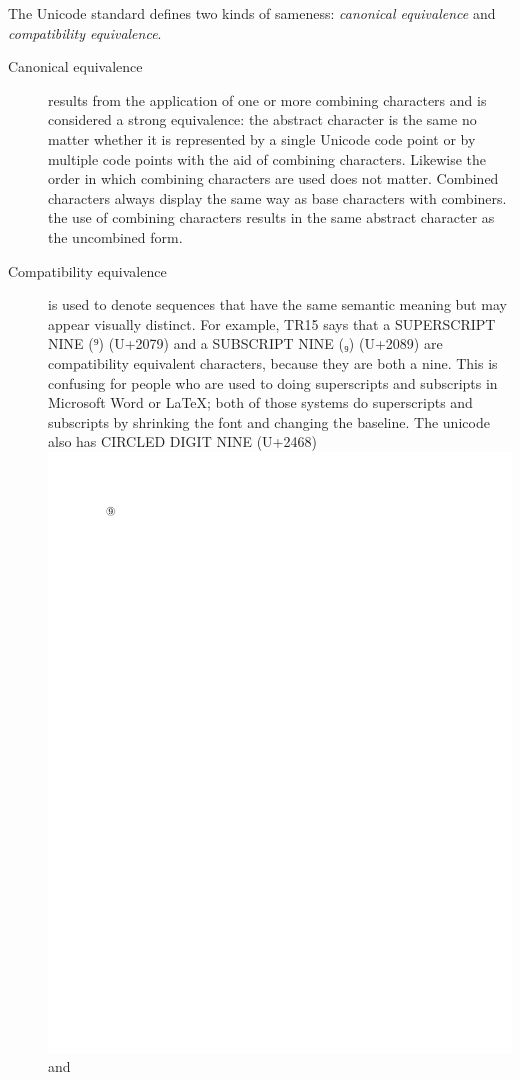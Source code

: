 The Unicode standard defines two kinds of sameness: \emph{canonical
equivalence} and \emph{compatibility equivalence}.

\begin{description}
\item[Canonical equivalence] results from
the application of one or more combining characters and is considered
a strong equivalence: the abstract character is the same no matter
whether it is represented by a single Unicode code point or by
multiple code points with the aid of combining characters. Likewise
the order in which combining characters are used does not
matter. Combined characters always display the same way as base
characters with combiners. the use of combining characters results in
the same abstract character as the uncombined form. 

% 
\item[Compatibility equivalence] is used to denote sequences that have the same semantic
meaning but may appear visually distinct. For example, TR15 says that a
SUPERSCRIPT NINE (⁹) (U+2079) and a SUBSCRIPT NINE (₉) (U+2089) are
compatibility equivalent characters, because they are both a
nine. This is confusing for people who are used to doing superscripts
and subscripts in Microsoft Word or LaTeX; both of those systems do
superscripts and subscripts by shrinking the font and changing the
baseline. The unicode also has CIRCLED DIGIT NINE (U+2468) \includegraphics{uni/unicode_2468} and

\end{description}

